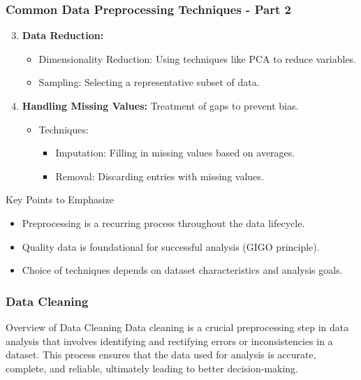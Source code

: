 \documentclass{beamer}
\begin{document}
\begin{frame}[fragile]
    \frametitle{Common Data Preprocessing Techniques - Part 2}
    \begin{enumerate}
        \setcounter{enumi}{2}
        \item \textbf{Data Reduction:} 
            \begin{itemize}
                \item Dimensionality Reduction: Using techniques like PCA to reduce variables.
                \item Sampling: Selecting a representative subset of data.
            \end{itemize}

        \item \textbf{Handling Missing Values:} Treatment of gaps to prevent bias.
            \begin{itemize}
                \item Techniques:
                    \begin{itemize}
                        \item Imputation: Filling in missing values based on averages.
                        \item Removal: Discarding entries with missing values.
                    \end{itemize}
            \end{itemize}
    \end{enumerate}

    \begin{block}{Key Points to Emphasize}
        \begin{itemize}
            \item Preprocessing is a recurring process throughout the data lifecycle.
            \item Quality data is foundational for successful analysis (GIGO principle).
            \item Choice of techniques depends on dataset characteristics and analysis goals.
        \end{itemize}
    \end{block}
\end{frame}

\begin{frame}
    \frametitle{Data Cleaning}
    \begin{block}{Overview of Data Cleaning}
        Data cleaning is a crucial preprocessing step in data analysis that involves identifying and rectifying errors or inconsistencies in a dataset. This process ensures that the data used for analysis is accurate, complete, and reliable, ultimately leading to better decision-making.
    \end{block}
\end{frame}
\end{document}
